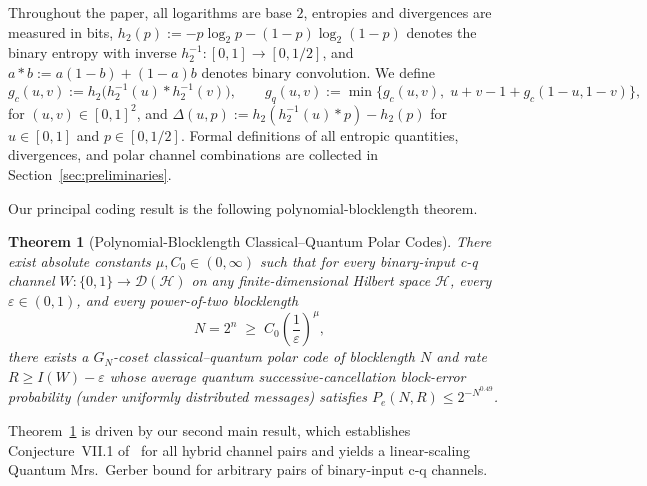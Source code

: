 \documentclass[10pt,a4paper]{article}
\numberwithin{equation}{section}
\theoremstyle{plain}
\newtheorem{theorem}{Theorem}[section]
\theoremstyle{definition}
\theoremstyle{remark}
\newcommand{\cH}{\mathcal{H}}
\newcommand{\cD}{\mathcal{D}}
\begin{document}
Throughout the paper, all logarithms are base $2$, entropies and divergences are measured in bits, $h_2(p) := -p \log_2 p - (1-p)\log_2(1-p)$ denotes the binary entropy with inverse $h_2^{-1} : [0,1] \to [0,1/2]$, and $a * b := a(1-b) + (1-a)b$ denotes binary convolution. We define
\[
g_c(u,v) := h_2\!\bigl(h_2^{-1}(u) * h_2^{-1}(v)\bigr), \qquad
g_q(u,v) := \min\bigl\{g_c(u,v),\; u + v - 1 + g_c(1-u, 1-v)\bigr\},
\]
for $(u,v) \in [0,1]^2$, and $\Delta(u,p) := h_2(h_2^{-1}(u) * p) - h_2(p)$ for $u \in [0,1]$ and $p \in [0,1/2]$. Formal definitions of all entropic quantities, divergences, and polar channel combinations are collected in Section~\ref{sec:preliminaries}.

Our principal coding result is the following polynomial-blocklength theorem.

\begin{theorem}[Polynomial-Blocklength Classical--Quantum Polar Codes]\label{thm:main-coding}
There exist absolute constants $\mu, C_0 \in (0,\infty)$ such that for every binary-input c-q channel $W : \{0,1\} \to \cD(\cH)$ on any finite-dimensional Hilbert space $\cH$, every $\varepsilon \in (0,1)$, and every power-of-two blocklength
\begin{equation}\label{eq:blocklength-bound}
N = 2^n \;\ge\; C_0 \left(\frac{1}{\varepsilon}\right)^{\mu},
\end{equation}
there exists a $G_N$-coset classical--quantum polar code of blocklength $N$ and rate $R \ge I(W) - \varepsilon$ whose average quantum successive-cancellation block-error probability (under uniformly distributed messages) satisfies $P_e(N,R) \le 2^{-N^{0.49}}$.
\end{theorem}

Theorem~\ref{thm:main-coding} is driven by our second main result, which establishes Conjecture~VII.1 of~\cite{HircheReeb2018} for all hybrid channel pairs and yields a linear-scaling Quantum Mrs.\ Gerber bound for arbitrary pairs of binary-input c-q channels.
\end{document}
